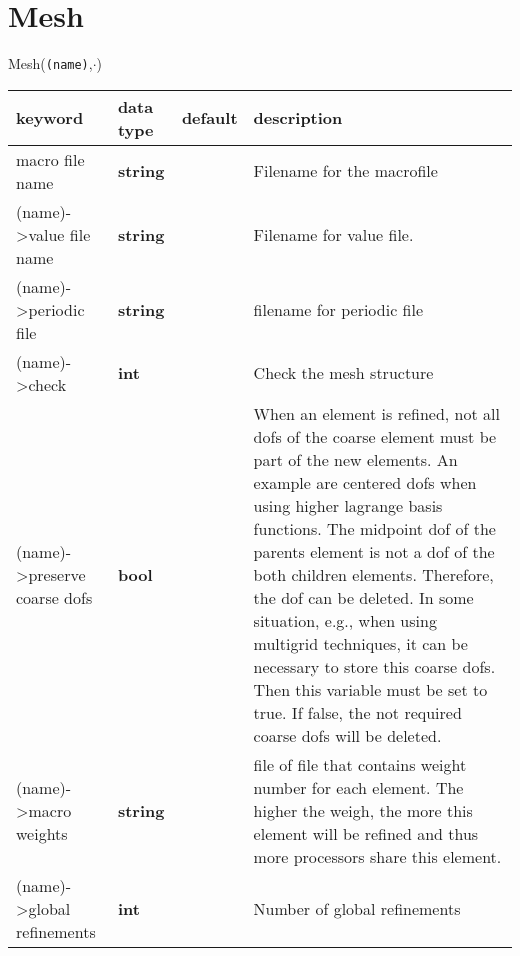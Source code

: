 \documentclass[10pt,a4paper]{article}
\newcommand{\basis}{{(name)->}}
\begin{document}
\section*{Mesh}
Mesh(\texttt{(name)},$\cdot$)
{
\small
\begin{longtable}[l]{|>{\ttfamily}lp{}>{\ttfamily}lp{}|}
\hline
\textrm{\textbf{keyword}} & \textrm{\textbf{data type}} & \textrm{\textbf{default}} & \textrm{\textbf{description}} \\
\hline\hline

\hline\basis macro file name & \textbf{string} & [] & Filename for the macrofile\\ \hline
\basis value file name & \textbf{string} & [] & Filename for value file. \\ \hline
\basis periodic file & \textbf{string} & [] & filename for periodic file\\ \hline
\basis check & \textbf{int} & [1] & Check the mesh structure\\ \hline
\basis preserve coarse dofs & \textbf{bool} & [0] & When an element is refined, not all dofs of the coarse element must be part of the new elements. An example are centered dofs when using higher lagrange basis functions. The midpoint dof of the parents element is not a dof of the both children elements. Therefore, the dof can be deleted. In some situation, e.g., when using multigrid techniques, it can be necessary to store this coarse dofs. Then this variable must be set to true. If false, the not required coarse dofs will be deleted.\\ \hline
\basis macro weights & \textbf{string} & [] & file of file that contains weight number for each element. The higher the weigh, the more this element will be refined and thus more processors share this element.\\ \hline
\basis global refinements & \textbf{int} & [0] & Number of global refinements\\ \hline
\end{longtable}
}
\end{document}

